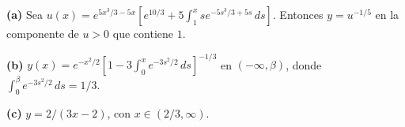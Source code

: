 \noindent\textbf{(a)} Sea $u(x)=e^{5x^3/3-5x}\left[e^{10/3}+5\int_1^x s e^{-5s^3/3+5s}\,ds\right]$. Entonces $y=u^{-1/5}$ en la componente de $u>0$ que contiene $1$.

\noindent\textbf{(b)} $y(x)=e^{-x^2/2}\left[1-3\int_0^x e^{-3s^2/2}\,ds\right]^{-1/3}$ en $(-\infty,\beta)$, donde $\int_0^\beta e^{-3s^2/2}\,ds=1/3$.

\noindent\textbf{(c)} $y=2/(3x-2)$, con $x\in(2/3,\infty)$.
